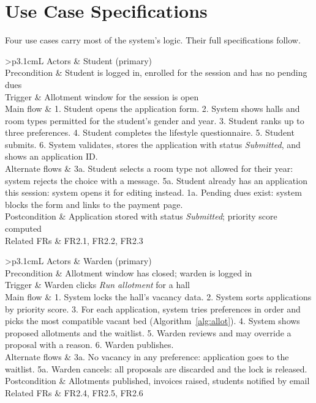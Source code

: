\documentclass[11pt,a4paper]{report}
\begin{document}
\section{Use Case Specifications}
Four use cases carry most of the system's logic. Their full specifications follow.

\newcommand{\ucspec}[8]{%
\begin{table}[H]\centering\small\caption{#1}
\begin{tabularx}{\textwidth}{>{\bfseries}p{3.1cm}L}
\toprule
Actors & #2\\ Precondition & #3\\ Trigger & #4\\ Main flow & #5\\ Alternate flows & #6\\ Postcondition & #7\\ Related FRs & #8\\
\bottomrule
\end{tabularx}\end{table}}

\ucspec{UC-01: Apply for room}{Student (primary)}{Student is logged in, enrolled for the session and has no pending dues}
{Allotment window for the session is open}
{1. Student opens the application form. 2. System shows halls and room types permitted for the student's gender and year. 3. Student ranks up to three preferences. 4. Student completes the lifestyle questionnaire. 5. Student submits. 6. System validates, stores the application with status \emph{Submitted}, and shows an application ID.}
{3a. Student selects a room type not allowed for their year: system rejects the choice with a message. 5a. Student already has an application this session: system opens it for editing instead. 1a. Pending dues exist: system blocks the form and links to the payment page.}
{Application stored with status \emph{Submitted}; priority score computed}{FR2.1, FR2.2, FR2.3}

\ucspec{UC-02: Run allotment engine}{Warden (primary)}{Allotment window has closed; warden is logged in}
{Warden clicks \emph{Run allotment} for a hall}
{1. System locks the hall's vacancy data. 2. System sorts applications by priority score. 3. For each application, system tries preferences in order and picks the most compatible vacant bed (Algorithm~\ref{alg:allot}). 4. System shows proposed allotments and the waitlist. 5. Warden reviews and may override a proposal with a reason. 6. Warden publishes.}
{3a. No vacancy in any preference: application goes to the waitlist. 5a. Warden cancels: all proposals are discarded and the lock is released.}
{Allotments published, invoices raised, students notified by email}{FR2.4, FR2.5, FR2.6}
\end{document}
